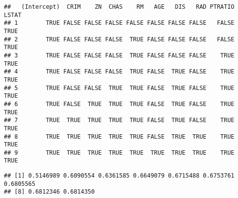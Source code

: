 \documentclass[
]{article}
\newenvironment{Shaded}{\begin{snugshade}}{\end{snugshade}}
\newcommand{\AttributeTok}[1]{\textcolor[rgb]{0.77,0.63,0.00}{#1}}
\newcommand{\DecValTok}[1]{\textcolor[rgb]{0.00,0.00,0.81}{#1}}
\newcommand{\FunctionTok}[1]{\textcolor[rgb]{0.00,0.00,0.00}{#1}}
\newcommand{\NormalTok}[1]{#1}
\newcommand{\OtherTok}[1]{\textcolor[rgb]{0.56,0.35,0.01}{#1}}
\newcommand{\SpecialCharTok}[1]{\textcolor[rgb]{0.00,0.00,0.00}{#1}}
\newcommand{\StringTok}[1]{\textcolor[rgb]{0.31,0.60,0.02}{#1}}
\begin{document}
\begin{Shaded}
\end{Shaded}

\begin{verbatim}
##   (Intercept)  CRIM    ZN  CHAS    RM   AGE   DIS   RAD PTRATIO LSTAT
## 1        TRUE FALSE FALSE FALSE FALSE FALSE FALSE FALSE   FALSE  TRUE
## 2        TRUE FALSE FALSE FALSE  TRUE FALSE FALSE FALSE   FALSE  TRUE
## 3        TRUE FALSE FALSE FALSE  TRUE FALSE FALSE FALSE    TRUE  TRUE
## 4        TRUE FALSE FALSE FALSE  TRUE FALSE  TRUE FALSE    TRUE  TRUE
## 5        TRUE FALSE FALSE  TRUE  TRUE FALSE  TRUE FALSE    TRUE  TRUE
## 6        TRUE FALSE  TRUE  TRUE  TRUE FALSE  TRUE FALSE    TRUE  TRUE
## 7        TRUE  TRUE  TRUE  TRUE  TRUE FALSE  TRUE FALSE    TRUE  TRUE
## 8        TRUE  TRUE  TRUE  TRUE  TRUE FALSE  TRUE  TRUE    TRUE  TRUE
## 9        TRUE  TRUE  TRUE  TRUE  TRUE  TRUE  TRUE  TRUE    TRUE  TRUE
\end{verbatim}

\begin{Shaded}
\end{Shaded}

\begin{verbatim}
## [1] 0.5146989 0.6090554 0.6361585 0.6649079 0.6715488 0.6753761 0.6805565
## [8] 0.6812346 0.6814350
\end{verbatim}

\begin{Shaded}
\end{Shaded}
\end{document}
